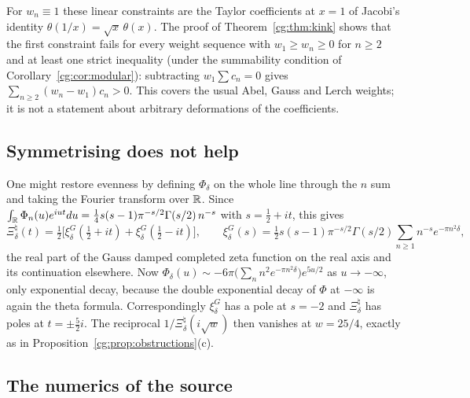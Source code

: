 For $w_n\equiv1$ these linear constraints are the Taylor coefficients at $x=1$ of Jacobi's identity $\theta(1/x)=\sqrt x\,\theta(x)$. The proof of Theorem~\ref{cg:thm:kink} shows that the first constraint fails for every weight sequence with $w_1\ge w_n\ge0$ for $n\ge2$ and at least one strict inequality (under the summability condition of Corollary~\ref{cg:cor:modular}): subtracting $w_1\sum c_n=0$ gives $\sum_{n\ge2}(w_n-w_1)c_n>0$. This covers the usual Abel, Gauss and Lerch weights; it is not a statement about arbitrary deformations of the coefficients.

\subsection{Symmetrising does not help}

One might restore evenness by defining $\Phi_\delta$ on the whole line through the $n$ sum and taking the Fourier transform over $\mathbb{R}$. Since $\int_{\mathbb{R}}\Phi_n(u)e^{iut}du=\frac14s(s-1)\pi^{-s/2}\Gamma(s/2)\,n^{-s}$ with $s=\frac12+it$, this gives
\[
\Xi^\natural_\delta(t)=\tfrac12\bigl[\xi^G_\delta(\tfrac12+it)+\xi^G_\delta(\tfrac12-it)\bigr],\qquad \xi^G_\delta(s)=\tfrac12s(s-1)\pi^{-s/2}\Gamma(s/2)\sum_{n\ge1}n^{-s}e^{-\pi n^2\delta},
\]
the real part of the Gauss damped completed zeta function on the real axis and its continuation elsewhere. Now $\Phi_\delta(u)\sim-6\pi\bigl(\sum_n n^2e^{-\pi n^2\delta}\bigr)e^{5u/2}$ as $u\to-\infty$, only exponential decay, because the double exponential decay of $\Phi$ at $-\infty$ is again the theta formula. Correspondingly $\xi^G_\delta$ has a pole at $s=-2$ and $\Xi^\natural_\delta$ has poles at $t=\pm\frac52i$. The reciprocal $1/\Xi^\natural_\delta(i\sqrt w)$ then vanishes at $w=25/4$, exactly as in Proposition~\ref{cg:prop:obstructions}(c).

\subsection{The numerics of the source}

